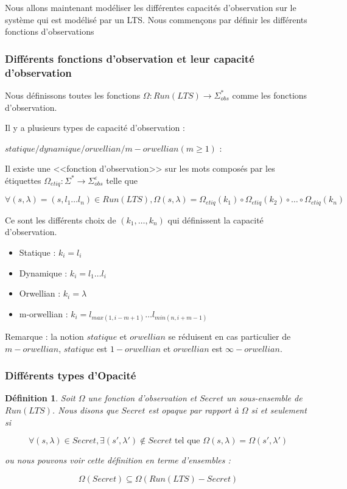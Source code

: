 \documentclass[10pt,a4paper]{article}
\newtheorem {mydef} {D\'efinition}
\begin{document}
Nous allons maintenant mod\'eliser les diff\'erentes capacit\'es d'observation sur le syst\`eme qui est mod\'elis\'e par un LTS. Nous commen\c cons par d\'efinir les diff\'erents fonctions d'observations

\subsubsection{Diff\'erents fonctions d'observation et leur capacit\'e d'observation}

Nous d\'efinissons toutes les fonctions $\Omega : Run(LTS) \rightarrow \Sigma_{obs}^*$ comme les fonctions   
 d'observation.
 
Il y a plusieurs types de capacit\'e d'observation : 


$statique/dynamique/orwellian/m-orwellian(m\geq 1)$ :
		
Il existe une <<fonction d'observation>> sur les mots compos\'es par les \'etiquettes $\Omega_{etiq} : \Sigma^* \rightarrow \Sigma_{obs}^{\varepsilon}$ telle que 
	
	$$\forall (s,\lambda)= (s,l_1\dots l_n) \in Run(LTS), \Omega(s,\lambda) = \Omega_{etiq}(k_1)\circ\Omega_{etiq}(k_2)\circ\dots\circ\Omega_{etiq}(k_n)$$
	
	Ce sont les diff\'erents choix de $(k_1,\dots, k_n)$ qui d\'efinissent la capacit\'e d'observation.
	



\begin{itemize}
        \item Statique : $k_i = l_i$ 
	\item Dynamique : $k_i = l_1 \dots l_i$
	\item Orwellian : $k_i = \lambda$
	\item m-orwellian : $k_i = l_{max(1,i-m+1)} \dots l_{min(n,i+m-1)}$		

\end{itemize}

	Remarque : la notion $statique$ et $orwellian$ se r\'eduisent en cas particulier de $m-orwellian$, $statique$ est $1-orwellian$ et $orwellian$ est $\infty-orwellian$.

	
\subsubsection{Diff\'erents types d'Opacit\'e}

\begin{mydef}
	Soit $\Omega$ une fonction d'observation et $Secret$ un sous-ensemble de $Run(LTS)$. Nous disons que $Secret$ est opaque par rapport \`a $\Omega$ si et seulement si
	
	$$\forall (s,\lambda) \in Secret, \exists (s',\lambda')\not\in Secret \mbox{ tel que } \Omega(s,\lambda) = \Omega (s',\lambda')$$
	
	ou nous pouvons voir cette d\'efinition en terme d'ensembles :
	
	$$\Omega(Secret)\subseteq \Omega(Run(LTS)-Secret)$$
\end{mydef}
\end{document}
